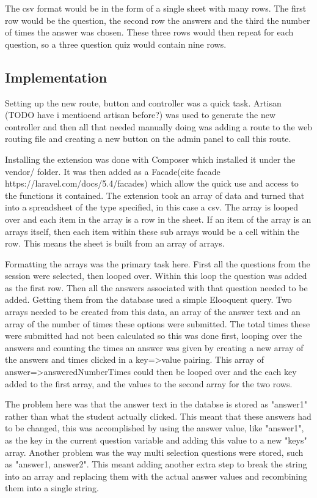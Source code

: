 \documentclass{article}
\begin{document}
The csv format would be in the form of a single sheet with many rows. The first row would be the question, the second row the answers and the third the number of times the answer was chosen. These three rows would then repeat for each question, so a three question quiz would contain nine rows.
\subsection{Implementation}
Setting up the new route, button and controller was a quick task. Artisan (TODO have i mentioend artisan before?) was used to generate the new controller and then all that needed manually doing was adding a route to the web routing file and creating a new button on the admin panel to call this route.

Installing the extension was done with Composer which installed it under the vendor/ folder. It was then added as a Facade(cite facade https://laravel.com/docs/5.4/facades) which allow the quick use and access to the functions it contained. The extension took an array of data and turned that into a spreadsheet of the type specified, in this case a csv. The array is looped over and each item in the array is a row in the sheet. If an item of the array is an arrays itself, then each item within these sub arrays would be a cell within the row. This means the sheet is built from an array of arrays. 

Formatting the arrays was the primary task here. First all the questions from the session were selected, then looped over. Within this loop the question was added as the first row. Then all the answers associated with that question needed to be added. Getting them from the database used a simple Elooquent query. Two arrays needed to be created from this data, an array of the answer text and an array of the number of times these options were submitted. The total times these were submitted had not been calculated so this was done first, looping over the answers and counting the times an answer was given by creating a new array of the answers and times clicked in a key=>value pairing. This array of answer=>answeredNumberTimes could then be looped over and the each key added to the first array, and the values to the second array for the two rows.

The problem here was that the answer text in the databse is stored as "answer1" rather than what the student actually clicked. This meant that these answers had to be changed, this was accomplished by using the answer value, like "answer1", as the key in the current question variable and adding this value to a new "keys" array. Another problem was the way multi selection questions were stored, such as "answer1, answer2". This meant adding another extra step to break the string into an array and replacing them with the actual answer values and recombining them into a single string.
\end{document}
